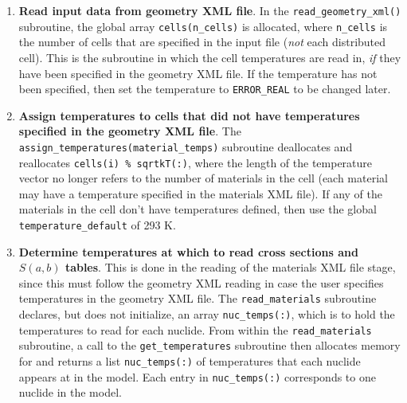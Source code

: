 \documentclass[10pt]{article}
\numberwithin{equation}{section} %
\begin{document}
\begin{enumerate}
\item {\bf Read input data from geometry XML file}. In the {\tt read\_geometry\_xml()} subroutine, the global array {\tt cells(n\_cells)} is allocated, where {\tt n\_cells} is the number of cells that are specified in the input file ({\it not} each distributed cell). This is the subroutine in which the cell temperatures are read in, {\it if} they have been specified in the geometry XML file. If the temperature has not been specified, then set the temperature to {\tt ERROR\_REAL} to be changed later. 

\begin{algorithm}[H]
\end{algorithm}

\item {\bf Assign temperatures to cells that did not have temperatures specified in the geometry XML file}. The {\tt assign\_temperatures(material\_temps)} subroutine deallocates and reallocates {\tt cells(i) \% sqrtkT(:)}, where the length of the temperature vector no longer refers to the number of materials in the cell (each material may have a temperature specified in the materials XML file). If any of the materials in the cell don't have temperatures defined, then use the global {\tt temperature\_default} of 293 K.

\item {\bf Determine temperatures at which to read cross sections and \(S(a,b)\) tables}. This is done in the reading of the materials XML file stage, since this must follow the geometry XML reading in case the user specifies temperatures in the geometry XML file. The {\tt read\_materials} subroutine declares, but does not initialize, an array {\tt nuc\_temps(:)}, which is to hold the temperatures to read for each nuclide. From within the {\tt read\_materials} subroutine, a call to the {\tt get\_temperatures} subroutine then allocates memory for and returns a list {\tt nuc\_temps(:)} of temperatures that each nuclide appears at in the model. Each entry in {\tt nuc\_temps(:)} corresponds to one nuclide in the model. 


\end{enumerate}
\end{document}
